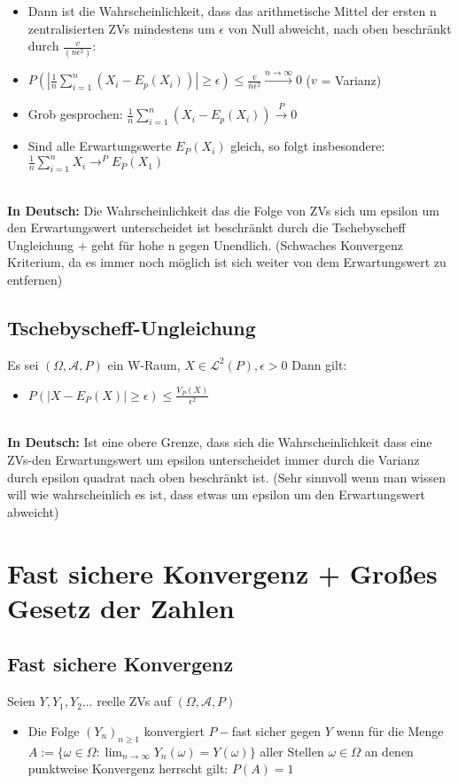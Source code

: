 \documentclass[a4paper,11pt]{scrartcl}
\begin{document}
\begin{itemize}
    \item 
    Dann ist die Wahrscheinlichkeit, dass das arithmetische Mittel der ersten n zentralisierten ZVs mindestens um $\epsilon$ von Null abweicht, nach oben beschränkt durch $\frac{v}{(n\epsilon^2)}$:
    \item
    $P(|\frac{1}{n} \sum_{i=1}^n (X_i -E_p(X_i))| \geq \epsilon) \leq \frac{v}{n \epsilon^2} \stackrel{n \rightarrow \infty}{\rightarrow} 0$ ($v$ = Varianz)
    \item Grob gesprochen: $\frac{1}{n} \sum_{i = 1}^n (X_i -E_p(X_i)) \stackrel{P}{\rightarrow} 0$
    \item Sind alle Erwartungswerte $E_P(X_i)$ gleich, so folgt insbesondere:
    $\frac{1}{n} \sum_{i = 1 }^n X_i \rightarrow^P E_P(X_1)$
\end{itemize}

\textbf{\\In Deutsch:}
Die Wahrscheinlichkeit das die Folge von ZVs sich um epsilon um den Erwartungswert unterscheidet ist beschränkt durch die Tschebyscheff Ungleichung + geht für hohe n gegen Unendlich.
(Schwaches Konvergenz Kriterium, da es immer noch möglich ist sich weiter von dem Erwartungswert zu entfernen)

\subsection{Tschebyscheff-Ungleichung}
Es sei $(\Omega, \mathcal{A}, P)$ ein W-Raum, $X \in \mathcal{L}^2(P), \epsilon > 0$ Dann gilt: 
\begin{itemize}
    \item $P(|X-E_P(X)| \geq \epsilon) \leq \frac{V_P(X)}{\epsilon^2}$
\end{itemize}


\textbf{\\In Deutsch:}
Ist eine obere Grenze, dass sich die Wahrscheinlichkeit dass eine ZVs-den Erwartungswert um epsilon unterscheidet immer durch die Varianz durch epsilon quadrat nach oben beschränkt ist.
(Sehr sinnvoll wenn man wissen will wie wahrscheinlich es ist, dass etwas um epsilon um den Erwartungswert abweicht)

\section{Fast sichere Konvergenz + Großes Gesetz der Zahlen}
\subsection{Fast sichere Konvergenz}
Seien $Y,Y_1,Y_2 \dots$ reelle ZVs auf $(\Omega, \mathcal{A},P)$
\begin{itemize}
    \item
    Die Folge $(Y_n)_{n\geq 1}$ konvergiert $P-$fast sicher gegen $Y$ wenn für die Menge $A := \{\omega \in \Omega: \lim_{n \rightarrow \infty} Y_n(\omega) = Y(\omega)\}$ aller Stellen $\omega \in \Omega$ an denen punktweise Konvergenz herrscht gilt: $P(A) = 1$
\end{itemize}
\end{document}
